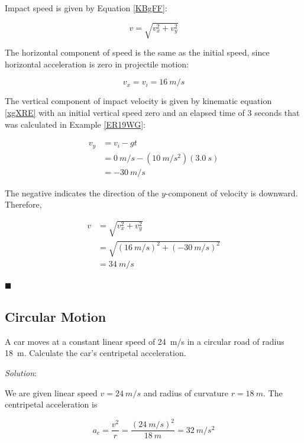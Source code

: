 \documentclass[dvipsnames]{article}
\begin{document}
Impact speed is given by Equation \eqref{KBgFF}:

\begin{equation*}
    v = \sqrt{v_x^2 + v_y^2}
\end{equation*}

The horizontal component of speed is the same as the initial speed, since horizontal acceleration is zero in projectile motion:

\begin{equation*}
    v_x = v_i = \SI{16}{m/s}
\end{equation*}

The vertical component of impact velocity is given by kinematic equation \eqref{xgXRE} with an initial vertical speed zero and an elapsed time of 3 seconds that was calculated in Example \ref{ER19WG}:

\begin{align*}
    v_y &= v_i - gt \\[1ex]
    &= \SI{0}{m/s} - (\SI{10}{m/s^2})(\SI{3.0}{s}) \\[1ex]
    &= -\SI{30}{m/s}
\end{align*}

The negative indicates the direction of the $y$-component of velocity is downward. Therefore,

\begin{align*}
    v &= \sqrt{v_x^2 + v_y^2} \\[1ex]
    &= \sqrt{(\SI{16}{m/s})^2 + (-\SI{30}{m/s})^2} \\[1ex]
    &= \boxed{\SI{34}{m/s}}
\end{align*}

\hfill $\blacksquare$

\clearpage

\subsection{Circular Motion}


\begin{example}
A car moves at a constant linear speed of \SI{24}{m/s} in a circular road of radius \SI{18}{m}. Calculate the car's centripetal acceleration.
\end{example}

\textit{Solution}:

We are given linear speed $v = \SI{24}{m/s}$ and radius of curvature $r = \SI{18}{m}$. The centripetal acceleration is

\begin{equation*}
    a_c = \frac{v^2}{r} = \frac{\left(\SI{24}{m/s}\right)^2}{\SI{18}{m}} = \boxed{\SI{32}{m/s^2}}
\end{equation*}
\end{document}
